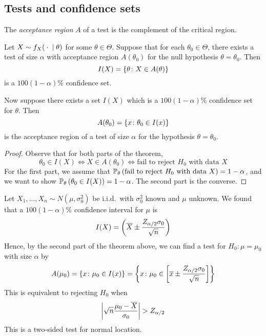 \subsection{Tests and confidence sets}
\begin{definition}
	The \textit{acceptance region} \( A \) of a test is the complement of the critical region.
\end{definition}
\begin{theorem}
	Let \( X \sim f_X({}\cdot{}\mid\theta) \) for some \( \theta \in \Theta \).
	Suppose that for each \( \theta_0 \in \Theta \), there exists a test of size \( \alpha \) with acceptance region \( A(\theta_0) \) for the  null hypothesis \( \theta = \theta_0 \).
	Then
	\[
		I(X) = \qty{\theta \colon X \in A(\theta)}
	\]
	is a \( 100(1-\alpha)\% \) confidence set.

	Now suppose there exists a set \( I(X) \) which is a \( 100(1-\alpha)\% \) confidence set for \( \theta \).
	Then
	\[
		A(\theta_0) = \qty{x \colon \theta_0 \in I(x)}
	\]
	is the acceptance region of a test of size \( \alpha \) for the hypothesis \( \theta = \theta_0 \).
\end{theorem}
\begin{proof}
	Observe that for both parts of the theorem,
	\[
		\theta_0 \in I(X) \iff X \in A(\theta_0) \iff \text{fail to reject } H_0 \text{ with data } X
	\]
	For the first part, we assume that \( \mathbb{P}_{\theta}\left({\text{fail to reject } H_0 \text{ with data } X}\right) = 1 - \alpha \), and we want to show \( \mathbb{P}_{\theta}\left({\theta_0 \in I(X)}\right) = 1 - \alpha \).
	The second part is the converse.
\end{proof}
\begin{example}
	Let \( X_1, \dots, X_n \sim N(\mu, \sigma_0^2) \) be i.i.d.\ with \( \sigma_0^2 \) known and \( \mu \) unknown.
	We found that a \( 100(1-\alpha)\% \) confidence interval for \( \mu \) is
	\[
		I(X) = \qty(\overline X \pm \frac{Z_{\alpha/2}\sigma_0}{\sqrt{n}})
	\]
	Hence, by the second part of the theorem above, we can find a test for \( H_0 \colon \mu = \mu_0 \) with size \( \alpha \) by
	\[
		A(\mu_0) = \qty{ x \colon \mu_0 \in I(x) } = \qty{ x \colon \mu_0 \in \qty[\overline x \pm \frac{Z_{\alpha/2} \sigma_0}{\sqrt{n}}] }
	\]
	This is equivalent to rejecting \( H_0 \) when
	\[
		\abs{\sqrt{n} \frac{\mu_0 - \overline X}{\sigma_0}} > Z_{\alpha/2}
	\]
	This is a two-sided test for normal location.
\end{example}
